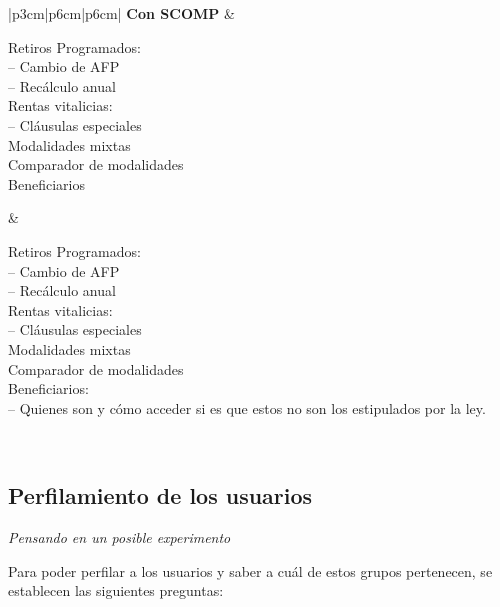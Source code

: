 \begin{table}[H]
\begin{tabular}{|p{3cm}|p{6cm}|p{6cm}|}
\textbf{Con SCOMP}
  & \begin{minipage}[t]{\linewidth} Retiros Programados:\\
    \quad– Cambio de AFP\\
    \quad– Recálculo anual\\
    Rentas vitalicias:\\
    \quad– Cláusulas especiales\\
    Modalidades mixtas\\
    Comparador de modalidades\\
    Beneficiarios
    \end{minipage}
  & \begin{minipage}[t]{\linewidth} Retiros Programados:\\
    \quad– Cambio de AFP\\
    \quad– Recálculo anual\\
    Rentas vitalicias:\\
    \quad– Cláusulas especiales\\
    Modalidades mixtas\\
    Comparador de modalidades\\
    Beneficiarios:\\
    \quad– Quienes son y cómo acceder si es que estos no son los estipulados por la ley.
    \end{minipage}
    \vspace{0.1cm}
\\ 
\hline
\end{tabular}
\caption{Tabla de contenidos según SCOMP y presencia de BL}
\label{tab:ejemplo_scomp_bl}
\end{table}


\subsection*{Perfilamiento de los usuarios} 
\textit{Pensando en un posible experimento}

Para poder perfilar a los usuarios y saber a cuál de estos grupos pertenecen, se establecen las siguientes preguntas: 

